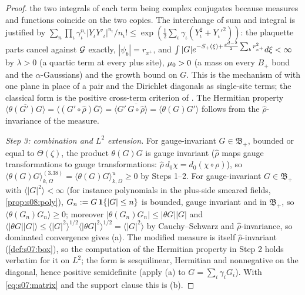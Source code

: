 \begin{proof}
the two integrals of each term being complex conjugates because measures and functions coincide on the two copies. The interchange of sum and integral is justified by $\sum_n\prod_\iota\gamma_\iota^{n_\iota}|Y_\iota Y'_\iota|^{n_\iota}/n_\iota!\le\exp(\frac12\sum_\iota\gamma_\iota(Y_\iota^2+Y_\iota'^2))$: the plaquette parts cancel against $\mathcal G$ exactly, $|\psi_b|=r_{x^+}$, and $\int|G|e^{-S_+(\xi)+\frac{\varepsilon^{d-2}}2\sum_br_{x^+}^2}d\xi<\infty$ by $\lambda>0$ (a quartic term at every plus site), $\mu_0>0$ (a mass on every $B_+$ bond and the $\alpha$-Gaussians) and the growth bound on $G$. This is the mechanism of \cite[lem:C-RPP(ii)]{SymPhase} with one plane in place of a pair and the Dirichlet diagonals as single-site terms; the classical form is the positive cross-term criterion of \cite{GJ,FILS78}. The Hermitian property $\overline{\langle\theta(G')G\rangle}=\langle(G'\circ\hat\rho)\bar G\rangle=\langle G'\,\overline{G\circ\hat\rho}\rangle=\langle\theta(G)G'\rangle$ follows from the $\hat\rho$-invariance of the measure.

\emph{Step 3: combination and $L^2$ extension.} For gauge-invariant $G\in\mathfrak B_+$, bounded or equal to $\Theta(\zeta)$, the product $\theta(G)G$ is gauge invariant ($\hat\rho$ maps gauge transformations to gauge transformations: $\hat\rho\,d_0\chi=d_0(\chi\circ\rho)$), so $\langle\theta(G)G\rangle^{(3.38)}_{k,\Omega}=\langle\theta(G)G\rangle^u_{k,\Omega}\ge0$ by Steps 1--2. For gauge-invariant $G\in\mathfrak B_+$ with $\langle|G|^2\rangle<\infty$ (for instance polynomials in the plus-side smeared fields, \cref{prop:s08:poly}), $G_n:= G\,\mathbf 1\{|G|\le n\}$ is bounded, gauge invariant and in $\mathfrak B_+$, so $\langle\theta(G_n)G_n\rangle\ge0$; moreover $|\theta(G_n)G_n|\le|\theta G||G|$ and $\langle|\theta G||G|\rangle\le\langle|G|^2\rangle^{1/2}\langle|\theta G|^2\rangle^{1/2}=\langle|G|^2\rangle$ by Cauchy--Schwarz and $\hat\rho$-invariance, so dominated convergence gives (a). The modified measure is itself $\hat\rho$-invariant (\cref{def:s07:box}), so the computation of the Hermitian property in Step 2 holds verbatim for it on $L^2$; the form is sesquilinear, Hermitian and nonnegative on the diagonal, hence positive semidefinite (apply (a) to $G=\sum_i\gamma_iG_i$). With \eqref{eq:s07:matrix} and the support clause this is (b).
\end{proof}


